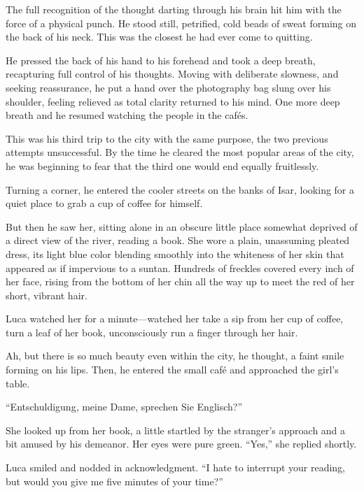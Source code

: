The full recognition of the thought darting through his brain hit him with the force of a physical punch. He stood still, petrified, cold beads of sweat forming on the back of his neck. This was the closest he had ever come to quitting.

He pressed the back of his hand to his forehead and took a deep breath, recapturing full control of his thoughts. Moving with deliberate slowness, and seeking reassurance, he put a hand over the photography bag slung over his shoulder, feeling relieved as total clarity returned to his mind. One more deep breath and he resumed watching the people in the cafés.

This was his third trip to the city with the same purpose, the two previous attempts unsuccessful. By the time he cleared the most popular areas of the city, he was beginning to fear that the third one would end equally fruitlessly.

Turning a corner, he entered the cooler streets on the banks of Isar, looking for a quiet place to grab a cup of coffee for himself.

But then he saw her, sitting alone in an obscure little place somewhat deprived of a direct view of the river, reading a book. She wore a plain, unassuming pleated dress, its light blue color blending smoothly into the whiteness of her skin that appeared as if impervious to a suntan. Hundreds of freckles covered every inch of her face, rising from the bottom of her chin all the way up to meet the red of her short, vibrant hair.

Luca watched her for a minute---watched her take a sip from her cup of coffee, turn a leaf of her book, unconsciously run a finger through her hair.

Ah, but there is so much beauty even within the city, he thought, a faint smile forming on his lips. Then, he entered the small café and approached the girl's table.


``Entschuldigung, meine Dame, sprechen Sie Englisch?''


She looked up from her book, a little startled by the stranger's approach and a bit amused by his demeanor. Her eyes were pure green. ``Yes,'' she replied shortly.

Luca smiled and nodded in acknowledgment. ``I hate to interrupt your reading, but would you give me five minutes of your time?''


